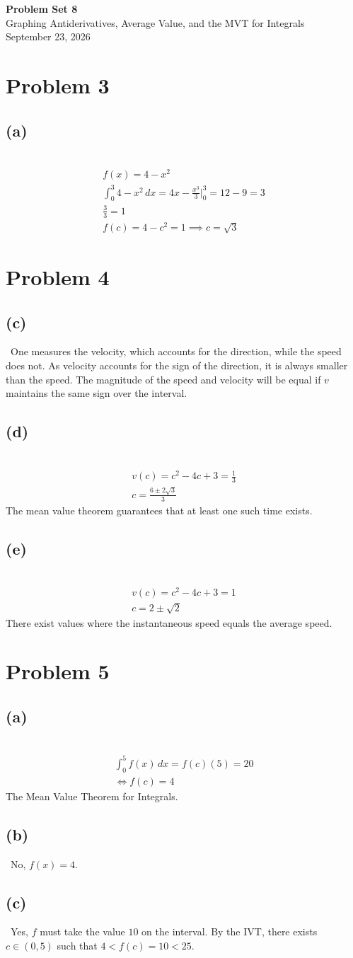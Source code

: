 \documentclass[12pt]{article}
\newcommand{\vem}{\vspace{0.5em}}
\newcommand{\problem}[1]{\section{Problem #1}}
\newcommand{\subproblem}[1]{\subsection{(#1)} \,}
\begin{document}
\vspace*{0cm}

\begin{center}
    {\Large \bfseries Problem Set 8} \\[0.5cm]
    {\large Graphing Antiderivatives, Average Value, and the MVT for Integrals} \\[0.35cm]
    {\normalsize September 23, 2026}
\end{center}


\problem{3}

\subproblem{a}
\begin{gather*}
    f(x)=4-x^2\\
    \int_0^3 4-x^2\, dx=4x-\frac{x^3}{3} \Big|^3_0 =12-9=3\\
    \frac{3}{3}=1\\
    f(c)=4-c^2=1 \implies c=\sqrt{3}
\end{gather*}

\problem{4}

\subproblem{c}
One measures the velocity, which accounts for the direction, while the speed does not. As velocity accounts for the sign of the direction, it is always smaller than the speed. The magnitude of the speed and velocity will be equal if $v$ maintains the same sign over the interval. \vem

\subproblem{d}
\begin{gather*}
    v(c)=c^2-4c+3=\frac{1}{3}\\
    c=\frac{6\pm 2\sqrt{3}}{3}
\end{gather*}
The mean value theorem guarantees that at least one such time exists. \vem

\subproblem{e}
\begin{gather*}
    v(c)=c^2-4c+3=1\\
    c=2\pm \sqrt{2}
\end{gather*}
There exist values where the instantaneous speed equals the average speed.

\problem{5}

\subproblem{a}
\begin{gather*}
    \int_0^5 f(x)\, dx=f(c)(5)=20\\
    \iff f(c)=4
\end{gather*}
The Mean Value Theorem for Integrals. \vem

\subproblem{b}
No, $f(x)=4$.\vem

\subproblem{c}
Yes, $f$ must take the value $10$ on the interval. By the IVT, there exists $c\in (0,5)$ such that $4<f(c)=10<25$.\vem
\end{document}
